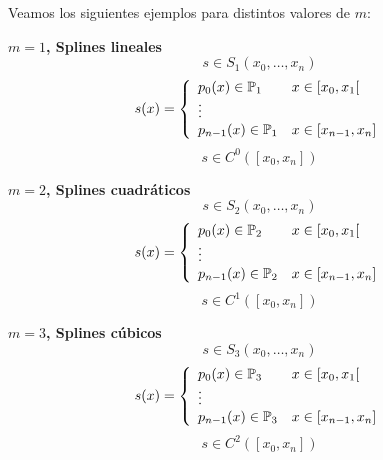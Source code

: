 \begin{ejemplo} Veamos los siguientes ejemplos para distintos valores de $m$:

    \textbf{$m=1$, Splines lineales}
$$s \in S_1(x_0, \ldots, x_n)$$
$$s(x) = \left\{\begin{array}{ll}
        p_0(x) \in \mathbb{P}_1     & x \in [x_0, x_1[     \\
        \vdots                                     \\
        p_{n-1}(x) \in \mathbb{P}_1 & x \in [x_{n-1}, x_n]
    \end{array}\right.$$
$$s \in C^0([x_0, x_n])$$

\textbf{$m=2$, Splines cuadráticos}
$$s \in S_2(x_0, \ldots, x_n)$$
$$s(x) = \left\{\begin{array}{ll}
        p_0(x) \in \mathbb{P}_2     & x \in [x_0, x_1[     \\
        \vdots                                     \\
        p_{n-1}(x) \in \mathbb{P}_2 & x \in [x_{n-1}, x_n]
    \end{array}\right.$$
$$s \in C^1([x_0, x_n])$$

\textbf{$m=3$, Splines cúbicos}
$$s \in S_3(x_0, \ldots, x_n)$$
$$s(x) = \left\{\begin{array}{ll}
        p_0(x) \in \mathbb{P}_3     & x \in [x_0, x_1[     \\
        \vdots                                     \\
        p_{n-1}(x) \in \mathbb{P}_3 & x \in [x_{n-1}, x_n]
    \end{array}\right.$$
$$s \in C^2([x_0, x_n])$$
\end{ejemplo}

